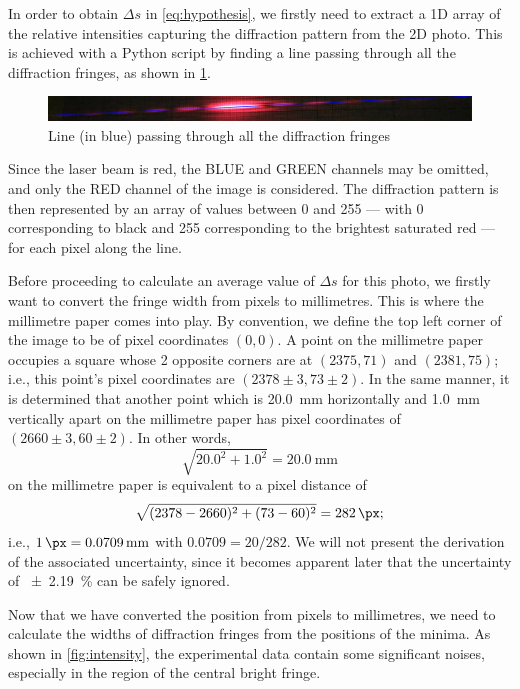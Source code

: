 \documentclass[a4paper, 12pt]{article}
\begin{document}
In order to obtain $\Delta s$ in \cref{eq:hypothesis}, we firstly need to extract a 1D array of the relative intensities capturing the diffraction pattern from the 2D photo. 
This is achieved with a Python script \autocite{py_extract} by finding a line passing through all the diffraction fringes, as shown in \cref{fig:processed-axis}.

\begin{figure}[H]
    \includegraphics[width=\textwidth]{scripts/processed-data/axis}
    \caption{Line (in blue) passing through all the diffraction fringes}
    \label{fig:processed-axis}
\end{figure}

Since the laser beam is red, the BLUE and GREEN channels may be omitted, and only the RED channel of the image is considered. 
The diffraction pattern is then represented by an array of values between 0 and 255 --- with 0 corresponding to black and 255 corresponding to the brightest saturated red --- for each pixel along the line. 

Before proceeding to calculate an average value of $\Delta s$ for this photo, we firstly want to convert the fringe width from pixels to millimetres. 
This is where the millimetre paper comes into play. 
By convention, we define the top left corner of the image to be of pixel coordinates $(0, 0)$. 
A point on the millimetre paper occupies a square whose 2 opposite corners are at $(2375, 71)$ and $(2381, 75)$; 
i.e., this point's pixel coordinates are $(2378 \pm 3, 73 \pm 2)$. 
In the same manner, it is determined that another point which is \SI{20.0}{\mm} horizontally and \SI{1.0}{\mm} vertically apart on the millimetre paper has pixel coordinates of $(2660 \pm 3, 60 \pm 2)$. 
In other words, 
\[ \sqrt{20.0^2 + 1.0^2} = \SI{20.0}{\mm} \]
on the millimetre paper is equivalent to a pixel distance of
\[ \sqrt{ (2378 - 2660)^2 + (73 - 60)^2 } = \SI{282}{\px}; \]
i.e., $\SI{1}{\px} = \SI{0.0709}{\mm}$ with $0.0709 = 20 / 282$.
We will not present the derivation of the associated uncertainty, since it becomes apparent later that the uncertainty of \SI{+-2.19}{\%} can be safely ignored.

Now that we have converted the position from pixels to millimetres, we need to calculate the widths of diffraction fringes from the positions of the minima. 
As shown in \cref{fig:intensity}, the experimental data contain some significant noises, especially in the region of the central bright fringe. 
\end{document}
